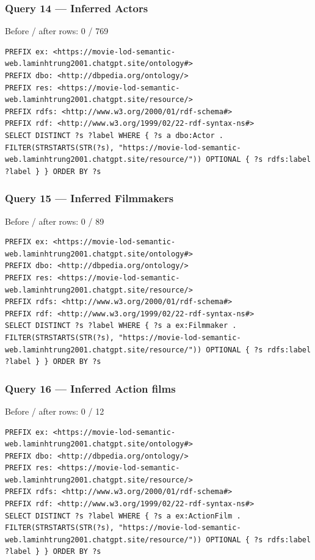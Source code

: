 \documentclass[
  11pt,
]{article}
\begin{document}
\subsubsection{Query 14 --- Inferred
Actors}\label{query-14-inferred-actors}

Before / after rows: 0 / 769

\begin{verbatim}
PREFIX ex: <https://movie-lod-semantic-web.laminhtrung2001.chatgpt.site/ontology#>
PREFIX dbo: <http://dbpedia.org/ontology/>
PREFIX res: <https://movie-lod-semantic-web.laminhtrung2001.chatgpt.site/resource/>
PREFIX rdfs: <http://www.w3.org/2000/01/rdf-schema#>
PREFIX rdf: <http://www.w3.org/1999/02/22-rdf-syntax-ns#>
SELECT DISTINCT ?s ?label WHERE { ?s a dbo:Actor . FILTER(STRSTARTS(STR(?s), "https://movie-lod-semantic-web.laminhtrung2001.chatgpt.site/resource/")) OPTIONAL { ?s rdfs:label ?label } } ORDER BY ?s
\end{verbatim}

\subsubsection{Query 15 --- Inferred
Filmmakers}\label{query-15-inferred-filmmakers}

Before / after rows: 0 / 89

\begin{verbatim}
PREFIX ex: <https://movie-lod-semantic-web.laminhtrung2001.chatgpt.site/ontology#>
PREFIX dbo: <http://dbpedia.org/ontology/>
PREFIX res: <https://movie-lod-semantic-web.laminhtrung2001.chatgpt.site/resource/>
PREFIX rdfs: <http://www.w3.org/2000/01/rdf-schema#>
PREFIX rdf: <http://www.w3.org/1999/02/22-rdf-syntax-ns#>
SELECT DISTINCT ?s ?label WHERE { ?s a ex:Filmmaker . FILTER(STRSTARTS(STR(?s), "https://movie-lod-semantic-web.laminhtrung2001.chatgpt.site/resource/")) OPTIONAL { ?s rdfs:label ?label } } ORDER BY ?s
\end{verbatim}

\subsubsection{Query 16 --- Inferred Action
films}\label{query-16-inferred-action-films}

Before / after rows: 0 / 12

\begin{verbatim}
PREFIX ex: <https://movie-lod-semantic-web.laminhtrung2001.chatgpt.site/ontology#>
PREFIX dbo: <http://dbpedia.org/ontology/>
PREFIX res: <https://movie-lod-semantic-web.laminhtrung2001.chatgpt.site/resource/>
PREFIX rdfs: <http://www.w3.org/2000/01/rdf-schema#>
PREFIX rdf: <http://www.w3.org/1999/02/22-rdf-syntax-ns#>
SELECT DISTINCT ?s ?label WHERE { ?s a ex:ActionFilm . FILTER(STRSTARTS(STR(?s), "https://movie-lod-semantic-web.laminhtrung2001.chatgpt.site/resource/")) OPTIONAL { ?s rdfs:label ?label } } ORDER BY ?s
\end{verbatim}
\end{document}
